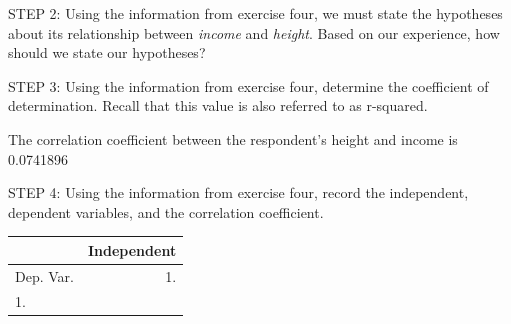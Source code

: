 \documentclass[11pt, chapterprefix=true]{scrbook}\usepackage[]{graphicx}\usepackage[]{color}
\begin{document}
\begin{exercises}
  \begin{exercise} %

    STEP 2: Using the information from exercise four, we must state the hypotheses about its relationship between {\textit{income}} and {\textit{height}}.  Based on our experience, how should we state our hypotheses?

    \vspace{5mm}

    \end{exercise}
    \vspace{2mm}

  \begin{exercise} %

    STEP 3: Using the information from exercise four, determine the coefficient of determination.  Recall that this value is also referred to as r-squared.

    \vspace{5mm}

    \end{exercise}
    \vspace{2mm}
    \begin{solution}

       The correlation coefficient between the respondent's height and income is 0.0741896

    \end{solution}

  \begin{exercise} %


    STEP 4: Using the information from exercise four, record the independent, dependent variables, and the correlation coefficient.

{\scriptsize{
    \begin{table}[ht]
    \centering
    \begin{tabular}{lr} \hline
        &  \multicolumn{1}{c}{Independent} \\ \hline

    Dep. Var. & 1. \underline{\phantom{xxxxxxxx}}      \\ \hline
    1. \underline{\phantom{xxxxxxxx}}  &  \underline{\phantom{xxxxxxxx}}       \\ \hline


\end{tabular}
\end{table}}}
\end{exercise}
\end{exercises}
\end{document}
